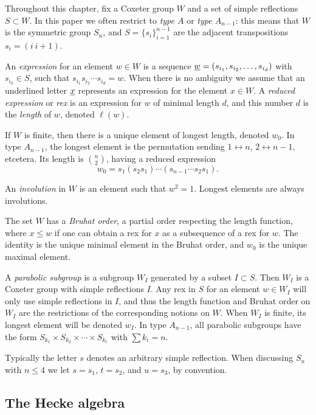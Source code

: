 Throughout this chapter, fix a Coxeter group $W$ and a set of simple reflections $S\subset W$. In this paper we often restrict to \emph{type $A$} or \emph{type $A_{n-1}$}: this means that $W$ is the symmetric group $S_n$, and $S = \{s_i\}_{i=1}^{n-1}$ are the adjacent transpositions $s_i = (i\ i+1)$.

An \emph{expression} for an element $w \in W$ is a sequence $\underline{w} = (s_{i_1}, s_{i_2}, \ldots, s_{i_d})$ with $s_{i_k} \in S$, such that $s_{i_1} s_{i_2} \cdots s_{i_d} = w$. When there is no ambiguity we assume that an underlined letter $\underline{x}$ represents an expression for the element $x \in W$. A \emph{reduced expression} or \emph{rex} is an expression for $w$ of minimal length $d$, and this number $d$ is the \emph{length} of $w$, denoted $\ell(w)$.

If $W$ is finite, then there is a unique element of longest length, denoted $w_0$. In type $A_{n-1}$, the longest element is the permutation sending $1\leftrightarrow n$,
$2\leftrightarrow n-1$, etcetera. Its length is $\binom{n}{2}$, having a reduced expression \[w_0=s_1(s_2s_1)\cdots (s_{n-1}\cdots s_2s_1).\]

An \emph{involution} in $W$ is an element such that $w^2=1$. Longest elements are always involutions.

The set $W$ has a \emph{Bruhat order}, a partial order respecting the length function, where $x \le w$ if one can obtain a rex for $x$ as a subsequence of a rex for $w$. The identity is the unique minimal element in the Bruhat order, and $w_0$ is the unique maximal element.

A \emph{parabolic subgroup} is a subgroup $W_I$ generated by a subset $I \subset S$. Then $W_I$ is a Coxeter group with simple reflections $I$. Any rex in $S$ for an element $w \in W_I$
will only use simple reflections in $I$, and thus the length function and Bruhat order on $W_I$ are the restrictions of the corresponding notions on $W$. When $W_I$ is finite, its
longest element will be denoted $w_I$. In type $A_{n-1}$, all parabolic subgroups have the form $S_{k_1} \times S_{k_2} \times \cdots \times S_{k_r}$ with $\sum k_i = n$.

Typically the letter $s$ denotes an arbitrary simple reflection. When discussing $S_n$ with $n \le 4$ we let $s = s_1$, $t = s_2$, and $u = s_3$, by convention.



\subsection{The Hecke algebra}
\label{subsec:Hecke}

